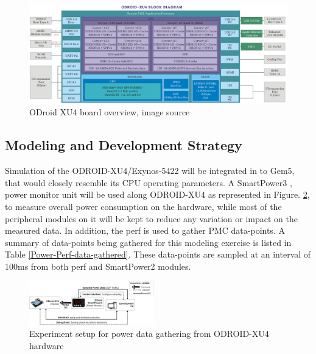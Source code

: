 \documentclass[conference]{IEEEtran}
\begin{document}
    \begin{figure}[bh]
        \includegraphics{rsrc/201506191222574523.png}
        \caption{ODroid XU4 board overview, image source\cite{odroid-xu4}}
        \label{fig-odroid-hwoverview}
    \end{figure}

    \subsection{Modeling and Development Strategy}
        \par Simulation of the ODROID-XU4/Exynos-5422 will be integrated in to Gem5, that would closely resemble its CPU operating parameters. A SmartPower3 \cite{odroid-smartpower3}, power monitor unit will be used along ODROID-XU4 as represented in Figure. \ref{fig-Experiment-setup}, to measure overall power consumption on the hardware, while most of the peripheral modules on it will be kept to reduce any variation or impact on the measured data. In addition, the perf\cite{2015137} is used to gather PMC data-points. A summary of data-points being gathered for this modeling exercise is listed in Table \ref{Power-Perf-data-gathered}. These data-points are sampled at an interval of 100ms from both perf and SmartPower2 modules.

        \begin{figure}[t]
            \centering
            \includegraphics[width=0.48\textwidth]{rsrc/Experiment-setup.drawio.png}
            \caption{Experiment setup for power data gathering from ODROID-XU4\cite{odroid-xu4} hardware}
            \label{fig-Experiment-setup}
        \end{figure}
\end{document}
